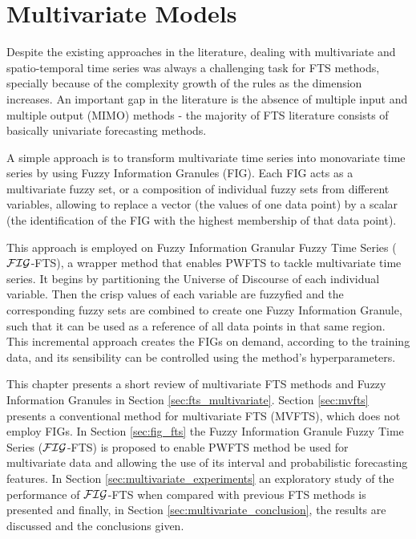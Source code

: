 
\chapter{Multivariate Models}
\label{chap:multivariate}

Despite the existing approaches in the literature, dealing with multivariate and spatio-temporal time series was always a challenging task for FTS methods, specially because of the complexity growth of the rules as the dimension increases. An important gap in the literature is the absence of multiple input and multiple output (MIMO) methods - the majority of FTS literature consists of basically univariate forecasting methods. 

A simple approach is to transform multivariate time series into monovariate time series by using Fuzzy Information Granules (FIG). Each FIG acts as a multivariate fuzzy set, or a composition of individual fuzzy sets from different variables, allowing to replace a vector (the values of one data point) by a scalar (the identification of the FIG with the highest membership of that data point).

This approach is employed on Fuzzy Information Granular Fuzzy Time Series ($\mathcal{FIG}$-FTS), a wrapper method that enables PWFTS to tackle multivariate time series. It begins by partitioning the Universe of Discourse of each individual variable. Then the crisp values of each variable are fuzzyfied and the corresponding fuzzy sets are combined to create one Fuzzy Information Granule, such that it can be used as a reference of all data points in that same region. This incremental approach creates the FIGs on demand, according to the training data, and its sensibility can be controlled using the method's hyperparameters. 

This chapter presents a short review of multivariate FTS methods and Fuzzy Information Granules in Section \ref{sec:fts_multivariate}. Section \ref{sec:mvfts} presents a conventional method for multivariate FTS (MVFTS), which does not employ FIGs. In Section \ref{sec:fig_fts} the Fuzzy Information Granule Fuzzy Time Series ($\mathcal{FIG}$-FTS) is proposed to enable PWFTS method be used for multivariate data and allowing the use of its interval and probabilistic forecasting features. In Section \ref{sec:multivariate_experiments} an exploratory study of the performance of $\mathcal{FIG}$-FTS when compared with previous FTS methods is presented and finally, in Section \ref{sec:multivariate_conclusion}, the results are discussed and the conclusions given. 


